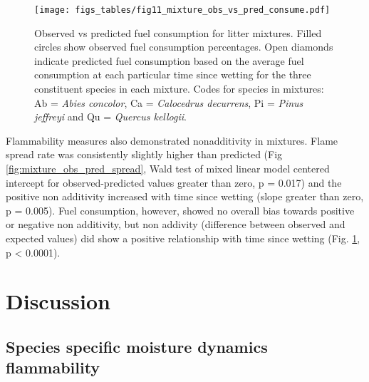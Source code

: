 \documentclass[fire,article,submit,moreauthors,pdftex]{Definitions/mdpi}
\begin{document}


\begin{figure}[H]
  \centering
\texttt{[image: figs\_tables/fig11\_mixture\_obs\_vs\_pred\_consume.pdf]}
\caption{Observed vs predicted fuel consumption for litter mixtures. Filled circles show observed fuel consumption percentages. Open diamonds indicate predicted fuel consumption based on the average fuel consumption at each particular time since wetting for the three constituent species in each mixture. Codes for species in mixtures: Ab = \emph{Abies concolor}, Ca = \emph{Calocedrus decurrens}, Pi = \emph{Pinus jeffreyi} and Qu = \emph{Quercus kellogii}.}
  \label{fig:mixture_obs_pred_consume}
\end{figure}


Flammability measures also demonstrated nonadditivity in mixtures. Flame spread rate was consistently slightly higher than predicted (Fig \ref{fig:mixture_obs_pred_spread}, Wald test of mixed linear model centered intercept for observed-predicted values greater than zero, p = 0.017) and the positive non additivity increased with time since wetting (slope greater than zero, p = 0.005). Fuel consumption, however, showed no overall bias towards positive or negative non additivity, but non addivity (difference between observed and expected values) did show a positive relationship with time since wetting (Fig. \ref{fig:mixture_obs_pred_consume}, p < 0.0001).

\section{Discussion}

\subsection{Species specific moisture dynamics flammability}
\end{document}
